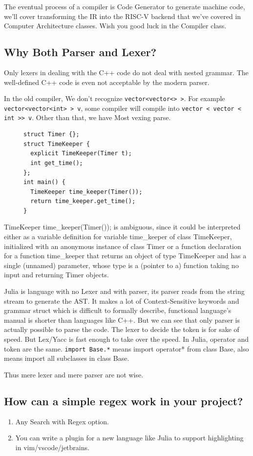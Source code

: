 \documentclass[a4paper]{exam}
\newcommand{\code}[1]{\texttt{#1}}
\begin{document}
The eventual process of a compiler is Code Generator to generate machine code, we'll cover transforming the IR into the RISC-V backend that we've covered in Computer Architecture classes. Wish you good luck in the Compiler class.

\subsection{Why Both Parser and Lexer?}
Only lexers in dealing with the C++ code do not deal with nested grammar. The well-defined C++ code is even not acceptable by the modern parser.

In the old compiler, We don't recognize \code{vector<vector<> >}. For example \code{vector<vector<int> > v}, some compiler will compile into \code{vector < vector < int >> v}. Other than that, we have Most vexing parse.

\begin{figure}[H]
  \begin{verbatim}
struct Timer {};
struct TimeKeeper {
  explicit TimeKeeper(Timer t);
  int get_time();
};
int main() {
  TimeKeeper time_keeper(Timer());
  return time_keeper.get_time();
}
    \end{verbatim}
\end{figure}

TimeKeeper time\_keeper(Timer()); is ambiguous, since it could be interpreted either as a variable definition for variable time\_keeper of class TimeKeeper, initialized with an anonymous instance of class Timer or a function declaration for a function time\_keeper that returns an object of type TimeKeeper and has a single (unnamed) parameter, whose type is a (pointer to a) function taking no input and returning Timer objects. \cite{mvp}

Julia is language with no Lexer and with parser, its parser reads from the string stream to generate the AST. It makes a lot of Context-Sensitive keywords and grammar struct which is difficult to formally describe, functional language's manual is shorter than languages like C++. But we can see that only parser is actually possible to parse the code. The lexer to decide the token is for sake of speed. But Lex/Yacc is fast enough to take over the speed. In Julia, operator and token are the same. \code{import Base.*} means import operator* from class Base, also means import all subclasses in class Base.

Thus mere lexer and mere parser are not wise.
\subsection{How can a simple regex work in your project?}
\begin{enumerate}
  \item Any Search with Regex option.
  \item You can write a plugin for a new language like Julia to support highlighting in vim/vscode/jetbrains.
\end{enumerate}
\end{document}
